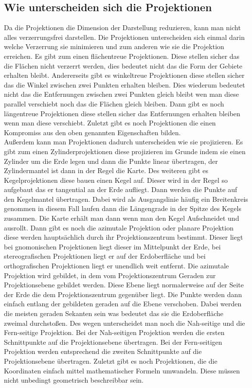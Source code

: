 \subsection{Wie unterscheiden sich die Projektionen}
Da die Projektionen die Dimension der Darstellung reduzieren, kann man nicht alles verzerrungsfrei darstellen. Die Projektionen unterscheiden sich einmal darin welche Verzerrung sie minimieren und zum anderen wie sie die Projektion erreichen. Es gibt zum einen flächentreue Projektionen. Diese stellen sicher das die Flächen nicht verzerrt werden, dies bedeutet nicht das die Form der Gebiete erhalten bleibt. Andererseits gibt es winkeltreue Projektionen diese stellen sicher das die Winkel zwischen zwei Punkten erhalten bleiben. Dies wiederum bedeutet nicht das die Entfernungen zwischen zwei Punkten gleich bleibt wen man diese parallel verschiebt noch das die Flächen gleich bleiben. Dann gibt es noch längentreue Projektionen diese stellen sicher das Entfernungen erhalten bleiben wenn man diese verschiebt. Zuletzt gibt es noch Projektionen die einen Kompromiss aus den oben genannten Eigenschaften bilden.\\
Außerdem kann man Projektionen dadurch unterscheiden wie sie projizieren. Es gibt zum einen Zylinderprojektionen diese projizieren im Grunde indem sie einen Zylinder um die Erde legen und dann die Punkte linear übertragen, der Zylindermantel ist dann in der Regel die Karte. Des weiteren gibt es Kegelprojektionen diese bauen einen Kegel auf. Dieser wird in der Regel so aufgebaut das er tangential an der Erde aufliegt. Dann werden die Punkte auf den Kegelmantel übertragen. Dabei wird als Ausgangslinie häufig ein Breitenkreis genommen in diesem Fall laufen dann die Längengrade in der Spitze des Kegels zusammen. Die Karte erhält man dann wenn man den Kegel Aufschneidet und ausrollt. Dann gibt es noch die azimutale Projektion oder planare Projektion diese werden hauptsächlich durch ihr Projektionszentrum bestimmt. Dieser liegt bei gnomonischen Projektionen liegt dieser im Mittelpunkt der Erde, bei stereografischen Projektionen liegt er auf der Erdoberfläche und bei orthografischen Projektionen liegt er unendlich weit entfernt. Die azimutale Projektion wird gebildet, in dem vom Projektionszentrum Geraden zur Projektionsebene gebildet werden. Diese Ebene liegt normalerweise auf der Seite der Erde die dem Projektionszentrum gegenüber liegt. Die Punkte werden dann einfach entlang der gebildeten geraden auf die Ebene verschoben. Dabei werden die meisten geraden Sekanten sein was bedeutet das sie die Erdoberfläche zweimal durchstoßen. Des wegen unterscheidet man noch die Nah-seitige und die Fern-seitige Projektion. Bei der Nah-seitigen Projektion werden die ersten Schnittpunkte auf die Projektionsebene übertragen. Bei der Fern-seitigen Projektion werden entsprechend die zweiten Schnittpunkte auf die Projektionsebene übertragen. Zuletzt gibt es noch Projektionen, die die Koordinaten einfach mittel mathematischer Formeln umwandeln. Diese müssen nicht unbedingt geometrisch beschreibbar sein. 
